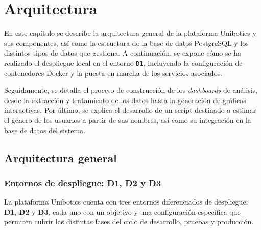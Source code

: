 \documentclass[a4paper, 12pt]{book}
\begin{document}
\chapter{Arquitectura}
\label{chap:diseño}

En este capítulo se describe la arquitectura general de la plataforma Unibotics y sus componentes, así como la estructura de la base de datos PostgreSQL y los distintos tipos de datos que gestiona. A continuación, se expone cómo se ha realizado el despliegue local en el entorno \texttt{D1}, incluyendo la configuración de contenedores Docker y la puesta en marcha de los servicios asociados.

Seguidamente, se detalla el proceso de construcción de los \textit{dashboards} de análisis, desde la extracción y tratamiento de los datos hasta la generación de gráficas interactivas. Por último, se explica el desarrollo de un script destinado a estimar el género de los usuarios a partir de sus nombres, así como su integración en la base de datos del sistema.

\section{Arquitectura general} 
\label{sec:arquitectura}

\subsection{Entornos de despliegue: D1, D2 y D3}
\label{subsec:entornosdespliegue}

La plataforma Unibotics cuenta con tres entornos diferenciados de despliegue: \textbf{D1}, \textbf{D2} y \textbf{D3}, cada uno con un objetivo y una configuración específica que permiten cubrir las distintas fases del ciclo de desarrollo, pruebas y producción.
\end{document}
